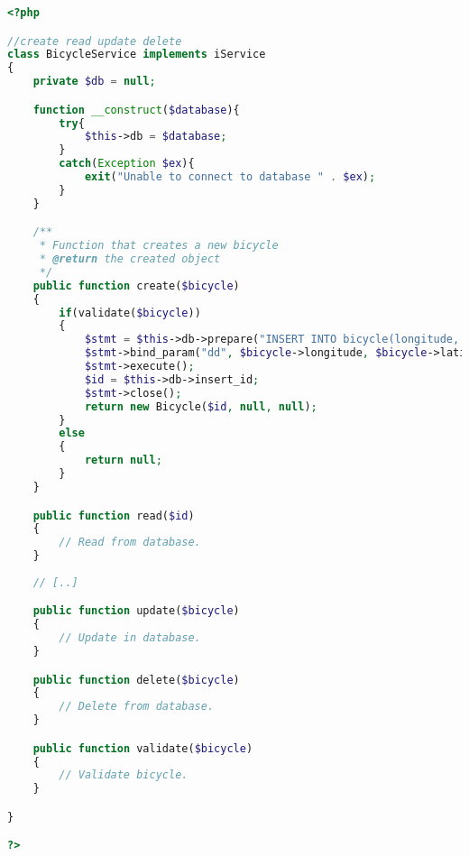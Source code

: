 \begin{lstlisting}[language=php, label=lst:bicycleService]
<?php

//create read update delete
class BicycleService implements iService
{
    private $db = null;

    function __construct($database){
        try{
            $this->db = $database;
        }
        catch(Exception $ex){
            exit("Unable to connect to database " . $ex);
        }
    }

    /**
     * Function that creates a new bicycle
     * @return the created object
     */
    public function create($bicycle)
    {
        if(validate($bicycle))
        {
            $stmt = $this->db->prepare("INSERT INTO bicycle(longitude, latitude) VALUES (?,?)");
            $stmt->bind_param("dd", $bicycle->longitude, $bicycle->latitude);
            $stmt->execute();
            $id = $this->db->insert_id;
            $stmt->close();
            return new Bicycle($id, null, null);
        }
        else
        {
            return null;
        }
    }

    public function read($id)
    {
        // Read from database.
    }
    
    // [..]

    public function update($bicycle)
    {
        // Update in database.
    }

    public function delete($bicycle)
    {
        // Delete from database.
    }

    public function validate($bicycle)
    {
        // Validate bicycle.
    }

}

?>

\end{lstlisting}